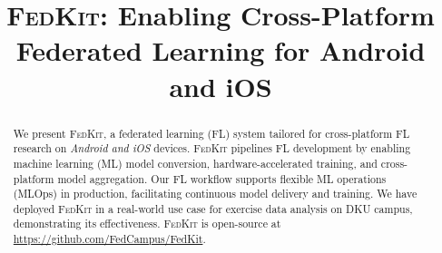 \documentclass[conference]{IEEEtran}
\begin{document}

\newcommand*\circled[1]{\tikz[baseline=(char.base)]{
        \node[shape=circle,draw,inner sep=.6pt] (char) {#1};}}
\newcommand{\FedCampus}{\textsc{FedCampus}}
\newcommand{\FedKit}{\textsc{FedKit}}
\newcommand{\challa}{\circled{$\boldsymbol\alpha$}}
\newcommand{\challb}{\circled{$\boldsymbol\beta$}}
\newcommand{\challc}{\circled{$\boldsymbol\gamma$}}

\title
{\FedKit{}: Enabling Cross-Platform Federated Learning for Android and iOS}

\author{
}

\maketitle

\begin{abstract}
    We present \FedKit{}, a federated learning (FL) system tailored for
    cross-platform FL research on \textit{Android and iOS} devices.
    \FedKit{} pipelines FL development by
    enabling machine learning (ML) model conversion,
    hardware-accelerated training,
    and cross-platform model aggregation.
    Our FL workflow supports flexible ML operations (MLOps) in production,
    facilitating continuous model delivery and training.
    We have deployed \FedKit{} in a real-world use case for
    exercise data analysis on DKU campus,
    demonstrating its effectiveness.
    \FedKit{} is open-source at \url{https://github.com/FedCampus/FedKit}.
\end{abstract}

\end{document}
